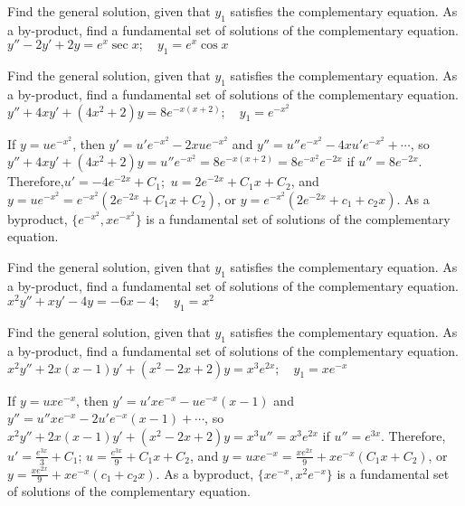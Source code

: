 \documentclass{ximera}
\begin{document}
\begin{problem}\label{exer:5.6.7}
Find the general solution,
given that $y_1$ satisfies the complementary equation. As a by-product,
find a fundamental set of solutions of the complementary equation. $y''-2y'+2y=e^x\sec x;   \quad y_1=e^x\cos x$
\end{problem}

\begin{problem}\label{exer:5.6.8}
Find the general solution,
given that $y_1$ satisfies the complementary equation. As a by-product,
find a fundamental set of solutions of the complementary equation. $y''+4xy'+(4x^2+2)y=8e^{-x(x+2)};   \quad y_1=e^{-x^2}$

\begin{solution}
    If $y=ue^{-x^2}$, then $y'=u'e^{-x^2}-2xue^{-x^2}$ and
$y''=u''e^{-x^2}-4xu'e^{-x^2}+\cdots$, so
$y''+4xy'+(4x^2+2)y=u''e^{-x^2}=8e^{-x(x+2)}=8e^{-x^2}e^{-2x}$ if
$u''=8e^{-2x}$. Therefore,$u'=-4e^{-2x}+C_1$;\ $u=2e^{-2x}+C_1x+C_2$,
and $y=ue^{-x^2}=e^{-x^2}(2e^{-2x}+C_1x+C_2)$, or
$y=e^{-x^2}(2e^{-2x}+c_1+c_2x)$. As a byproduct,
$\{e^{-x^2},xe^{-x^2}\}$ is a fundamental set of solutions of the
complementary equation.

\end{solution}
\end{problem}

\begin{problem}\label{exer:5.6.9}
Find the general solution,
given that $y_1$ satisfies the complementary equation. As a by-product,
find a fundamental set of solutions of the complementary equation. $x^2y''+xy'-4y=-6x-4;  \quad y_1=x^2$
\end{problem}

\begin{problem}\label{exer:5.6.10}
Find the general solution,
given that $y_1$ satisfies the complementary equation. As a by-product,
find a fundamental set of solutions of the complementary equation. $x^2y''+2x(x-1)y'+(x^2-2x+2)y=x^3e^{2x};   \quad y_1=xe^{-x}$

\begin{solution}
    If $y=uxe^{-x}$, then $y'=u'xe^{-x}-ue^{-x}(x-1)$ and
$y''=u''xe^{-x}-2u'e^{-x}(x-1)+\cdots$, so
$x^2y''+2x(x-1)y'+(x^2-2x+2)y=x^3u''=x^3e^{2x}$ if $u''=e^{3x}$.
Therefore,$u'=\frac{e^{3x}}{3}+C_1$;\;
$u=\frac{e^{3x}}{9}+C_1x+C_2$, and
$y=uxe^{-x}=\frac{xe^{2x}}{9}+xe^{-x}(C_1x+C_2)$, or
$y=\frac{xe^{2x}}{9}+xe^{-x}(c_1+c_2x)$. As a byproduct,
$\{xe^{-x},x^2e^{-x}\}$ is a fundamental set of solutions of the
complementary equation.
\end{solution}
\end{problem}
\end{document}
